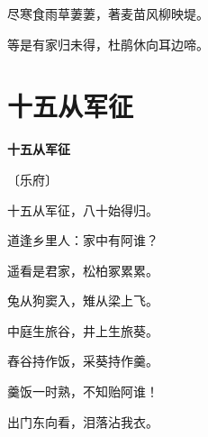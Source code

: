 \documentclass[12pt,UTF-8,openany,fontset=none]{ctexbook}
\begin{document}
    \vspace{18pt}

\begin{center}
    \begin{Large}

        尽寒食雨草萋萋，著麦苗风柳映堤。

        等是有家归未得，杜鹃休向耳边啼。

    \end{Large}

\end{center}

\vspace{8pt}
\clearpage

\section{十五从军征}


\begin{center}
    {\bfseries 十五从军征}

    \vspace{18pt}

    \begin{large}\xuwen
        〔乐府〕
    \end{large}

\end{center}

    \vspace{18pt}  %

\begin{center}
    \begin{Large}

        十五从军征，八十始得归。

        道逢乡里人：家中有阿谁？

        遥看是君家，松柏冢累累。

        兔从狗窦入，雉从梁上飞。

        中庭生旅谷，井上生旅葵。

        舂谷持作饭，采葵持作羹。

        羹饭一时熟，不知贻阿谁！

        出门东向看，泪落沾我衣。

    \end{Large}

\end{center}

\vspace{8pt}
\clearpage
\end{document}
